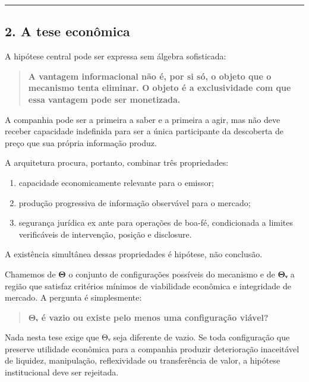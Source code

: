 \documentclass[
  a4paper,
]{article}
\providecommand{\tightlist}{%
  \setlength{\itemsep}{0pt}\setlength{\parskip}{0pt}}
\begin{document}
\begin{center}\rule{0.5\linewidth}{0.5pt}\end{center}

\hypertarget{2-a-tese-economica}{}

\hypertarget{2-a-tese-econuxf4mica}{%
\subsection{2. A tese econômica}\label{2-a-tese-econuxf4mica}}

A hipótese central pode ser expressa sem álgebra sofisticada:

\begin{quote}
\textbf{A vantagem informacional não é, por si só, o objeto que o
mecanismo tenta eliminar. O objeto é a exclusividade com que essa
vantagem pode ser monetizada.}
\end{quote}

A companhia pode ser a primeira a saber e a primeira a agir, mas não
deve receber capacidade indefinida para ser a única participante da
descoberta de preço que sua própria informação produz.

A arquitetura procura, portanto, combinar três propriedades:

\begin{enumerate}
\def\labelenumi{\arabic{enumi}.}
\tightlist
\item
  capacidade economicamente relevante para o emissor;
\item
  produção progressiva de informação observável para o mercado;
\item
  segurança jurídica ex ante para operações de boa-fé, condicionada a
  limites verificáveis de intervenção, posição e disclosure.
\end{enumerate}

A existência simultânea dessas propriedades é hipótese, não conclusão.

Chamemos de \textbf{Θ} o conjunto de configurações possíveis do
mecanismo e de \textbf{Θᵥ} a região que satisfaz critérios mínimos de
viabilidade econômica e integridade de mercado. A pergunta é
simplesmente:

\begin{quote}
\textbf{Θᵥ é vazio ou existe pelo menos uma configuração viável?}
\end{quote}

Nada nesta tese exige que Θᵥ seja diferente de vazio. Se toda
configuração que preserve utilidade econômica para a companhia produzir
deterioração inaceitável de liquidez, manipulação, reflexividade ou
transferência de valor, a hipótese institucional deve ser rejeitada.
\end{document}
